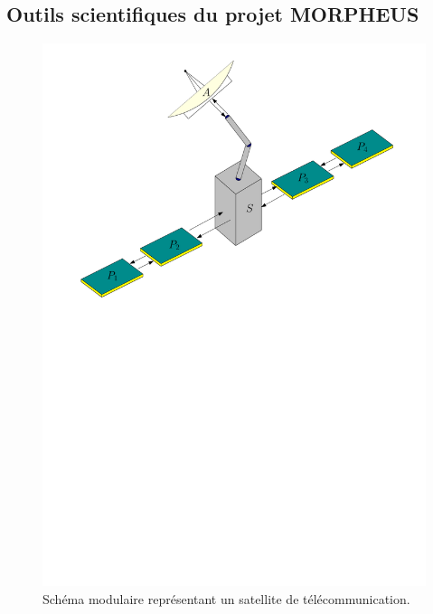 \documentclass[12pt, french]{article}
\begin{document}
	
	\subsection{Outils scientifiques du projet MORPHEUS}
	
	\begin{figure}[tb]
		\centering
		\includegraphics[width=.6\textwidth]{satellite.pdf}
		\caption{Schéma modulaire représentant un satellite de télécommunication.}
		\label{fig:satellite}
	\end{figure}
	
\end{document}

